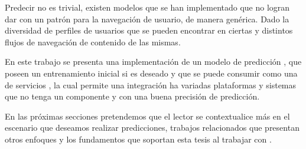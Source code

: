 Predecir no es trivial, existen modelos que se han implementado que no logran dar con un patrón para la navegación de usuario, de manera genérica. Dado la diversidad de perfiles de usuarios que se pueden encontrar en ciertas \webs  y distintos flujos de navegación de contenido de las mismas.  

En este trabajo se presenta una implementación de un modelo de predicción \online, que poseen un entrenamiento inicial \offline si es deseado y que se puede consumir como una \API de servicios \REST, la cual permite una integración ha variadas plataformas y sistemas que no tenga un componente \online y con una buena precisión de predicción. 

En las próximas secciones pretendemos que el lector se contextualice más en el escenario que deseamos realizar predicciones, trabajos relacionados que presentan otros enfoques y los fundamentos que soportan esta tesis al trabajar con \webasccesslog.



